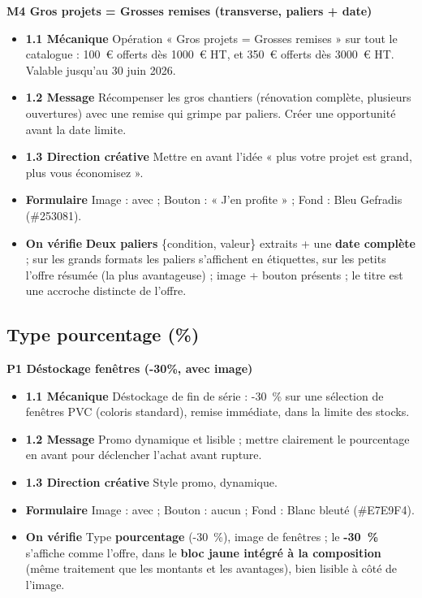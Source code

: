 \documentclass[11pt,a4paper]{article}
\begin{document}
\textbf{M4 \textbullet{} Gros projets = Grosses remises (transverse, paliers + date)}
\begin{itemize}[leftmargin=1.4em]
  \item \textbf{1.1 Mécanique} Opération « Gros projets = Grosses remises » sur tout le
        catalogue : 100~€ offerts dès 1000~€ HT, et 350~€ offerts dès 3000~€ HT. Valable
        jusqu'au 30 juin 2026.
  \item \textbf{1.2 Message} Récompenser les gros chantiers (rénovation complète, plusieurs
        ouvertures) avec une remise qui grimpe par paliers. Créer une opportunité avant la
        date limite.
  \item \textbf{1.3 Direction créative} Mettre en avant l'idée « plus votre projet est grand,
        plus vous économisez ».
  \item \textbf{Formulaire} Image : avec ; Bouton : « J'en profite » ; Fond : Bleu Gefradis (\#253081).
  \item \textbf{On vérifie} \textbf{Deux paliers} \{condition, valeur\} extraits + une
        \textbf{date complète} ; sur les grands formats les paliers s'affichent en étiquettes,
        sur les petits l'offre résumée (la plus avantageuse) ; image + bouton présents ; le
        titre est une accroche distincte de l'offre.
\end{itemize}

\subsection{Type pourcentage (\%)}

\textbf{P1 \textbullet{} Déstockage fenêtres (-30\%, avec image)}
\begin{itemize}[leftmargin=1.4em]
  \item \textbf{1.1 Mécanique} Déstockage de fin de série : -30~\% sur une sélection de
        fenêtres PVC (coloris standard), remise immédiate, dans la limite des stocks.
  \item \textbf{1.2 Message} Promo dynamique et lisible ; mettre clairement le pourcentage
        en avant pour déclencher l'achat avant rupture.
  \item \textbf{1.3 Direction créative} Style promo, dynamique.
  \item \textbf{Formulaire} Image : avec ; Bouton : aucun ; Fond : Blanc bleuté (\#E7E9F4).
  \item \textbf{On vérifie} Type \textbf{pourcentage} (-30~\%), image de fenêtres ; le
        \textbf{-30~\%} s'affiche comme l'offre, dans le \textbf{bloc jaune intégré à la
        composition} (même traitement que les montants et les avantages), bien lisible à côté
        de l'image.
\end{itemize}
\end{document}
